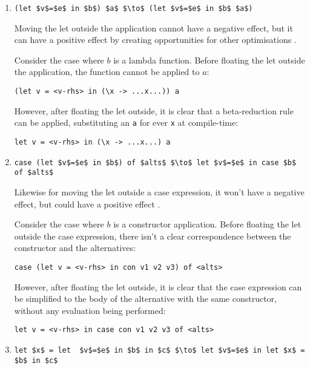 \begin{enumerate}
\item \lstinline[style=math]{(let $v$=$e$ in $b$) $a$ $\to$ (let $v$=$e$ in $b$ $a$)}

Moving the let outside the application cannot have a negative effect, but it can have a positive effect by creating opportunities for other optimisations \citep{jones1996}.

Consider the case where $b$ is a lambda function. Before floating the let outside the application, the function cannot be applied to $a$:

\begin{lstlisting}
(let v = <v-rhs> in (\x -> ...x...)) a
\end{lstlisting}

However, after floating the let outside, it is clear that a beta-reduction rule can be applied, substituting an \lstinline{a} for ever \lstinline{x} at compile-time:

\begin{lstlisting}
let v = <v-rhs> in (\x -> ...x...) a
\end{lstlisting}

\item \lstinline[style=math]{case (let $v$=$e$ in $b$) of $alts$ $\to$ let $v$=$e$ in case $b$ of $alts$}

Likewise for moving the let outside a case expression, it won't have a negative effect, but could have a positive effect \citep{jones1996}.

Consider the case where $b$ is a constructor application. Before floating the let outside the case expression, there isn't a clear correspondence between the constructor and the alternatives:

\begin{lstlisting}
case (let v = <v-rhs> in con v1 v2 v3) of <alts>
\end{lstlisting}

However, after floating the let outside, it is clear that the case expression can be simplified to the body of the alternative with the same constructor, without any evaluation being performed:

\begin{lstlisting}
let v = <v-rhs> in case con v1 v2 v3 of <alts>
\end{lstlisting}

\item \lstinline[style=math]{let $x$ = let  $v$=$e$ in $b$ in $c$ $\to$ let $v$=$e$ in let $x$ = $b$ in $c$}


\end{enumerate}
